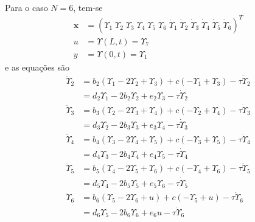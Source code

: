 \documentclass[a4paper,11pt]{scrartcl} %
\numberwithin{equation}{section} %
\numberwithin{figure}{section} %
\numberwithin{table}{section} %
\begin{document}
\paragraph{} Para o caso $N=6$, tem-se \begin{align}
\mathbf{x} &= \left(\Upsilon_1\;\Upsilon_2\;\Upsilon_3\;\Upsilon_4\;\Upsilon_5\;\Upsilon_6\;\dot{\Upsilon}_1\;\dot{\Upsilon}_2\;\dot{\Upsilon}_3\;\dot{\Upsilon}_4\;\dot{\Upsilon}_5\;\dot{\Upsilon}_6\right)^T 	\\
u &= \Upsilon(L,t) = \Upsilon_7\label{ufor6}\\
y &= \Upsilon(0,t) = \Upsilon_1\label{yfor6}
 \end{align} e as equações são \begin{align}
 	\ddot{\Upsilon}_2 &=  b_2\left(\Upsilon_{1}-2\Upsilon_{2} + \Upsilon_{3}\right)+c(-\Upsilon_1 + \Upsilon_3)-\tau \dot{\Upsilon}_2\nonumber \\
 	&= d_2\Upsilon_1 - 2b_2 \Upsilon_2 + e_2\Upsilon_3 - \tau \dot{\Upsilon}_2\\
 	\ddot{\Upsilon}_3 &=  b_3\left(\Upsilon_{2}-2\Upsilon_{3} + \Upsilon_{4}\right)+c(-\Upsilon_2 + \Upsilon_4)-\tau \dot{\Upsilon}_3\nonumber \\
 	&= d_3\Upsilon_2 - 2b_3 \Upsilon_3 + e_3\Upsilon_4 - \tau \dot{\Upsilon}_3\\
 	\ddot{\Upsilon}_4 &=  b_4\left(\Upsilon_{3}-2\Upsilon_{4} + \Upsilon_{5}\right)+c(-\Upsilon_3 + \Upsilon_5)-\tau \dot{\Upsilon}_4 \nonumber\\
 	&= d_4\Upsilon_3 - 2b_4 \Upsilon_4 + e_4\Upsilon_5 - \tau \dot{\Upsilon}_4\\
 	\ddot{\Upsilon}_5 &=  b_5\left(\Upsilon_{4}-2\Upsilon_{5} + \Upsilon_{6}\right)+c(-\Upsilon_4 + \Upsilon_6)-\tau \dot{\Upsilon}_5\nonumber\\
 	&= d_5\Upsilon_4 - 2b_5 \Upsilon_5 + e_5\Upsilon_6 - \tau \dot{\Upsilon}_5\\
 	\ddot{\Upsilon}_6 &=  b_6\left(\Upsilon_{5}-2\Upsilon_{6} + u\right)+c(-\Upsilon_5 + u)-\tau \dot{\Upsilon}_6\nonumber\\
 	&= d_6\Upsilon_5 - 2b_6 \Upsilon_6 + e_6 u - \tau \dot{\Upsilon}_6
 \end{align} 
 
\end{document}
